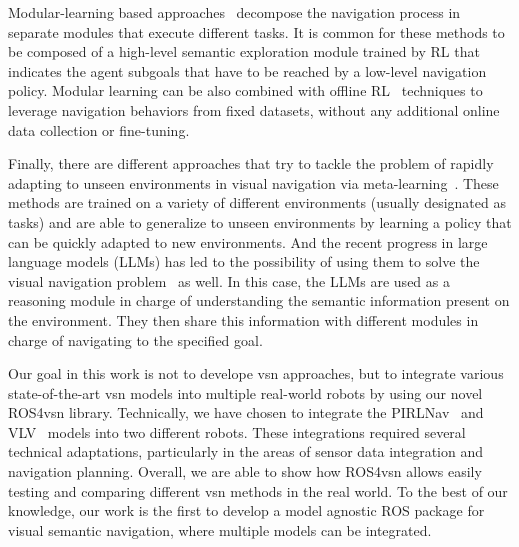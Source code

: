 Modular-learning based approaches~\cite{chaplot2020, chang2020, skillfusion, Li2023RDDRLAR, zhou2022improving, Cai2024DGMemLV, Kang2024HSPNavHS, Wang2023ProbableOL, Wasserman2023ExploitationGuidedEF, Yokoyama2023VLFMVF} decompose the navigation process in separate modules that execute different tasks.
It is common for these methods to be composed of a high-level semantic exploration module trained by RL that indicates the agent subgoals that have to be reached by a low-level navigation policy.
Modular learning can be also combined with offline RL~\cite{shah2022} techniques to leverage navigation behaviors from fixed datasets, without any additional online data collection or fine-tuning.

Finally, there are different approaches that try to tackle the problem of rapidly adapting to unseen environments in visual navigation via meta-learning~\cite{wortsman2019, luo2021, zhang2022}.
These methods are trained on a variety of different environments (usually designated as tasks) and are able to generalize to unseen environments by learning a policy that can be quickly adapted to new environments.
And the recent progress in large language models (LLMs) has led to the possibility of using them to solve the visual navigation problem~\cite{Huang2023, Zhou2023} as well.
In this case, the LLMs are used as a reasoning module in charge of understanding the semantic information present on the environment.
They then share this information with different modules in charge of navigating to the specified goal.

Our goal in this work is not to develope \acrshort{vsn} approaches, but to integrate various state-of-the-art \acrshort{vsn} models into multiple real-world robots by using our novel ROS4\acrshort{vsn} library.
Technically, we have chosen to integrate the PIRLNav~\cite{ramrakhya2023} and VLV~\cite{chang2020} models into two different robots.
These integrations required several technical adaptations, particularly in the areas of sensor data integration and navigation planning.
Overall, we are able to show how ROS4\acrshort{vsn} allows easily testing and comparing different \acrshort{vsn} methods in the real world.
To the best of our knowledge, our work is the first to develop a model agnostic ROS package for visual semantic navigation, where multiple models can be integrated.

